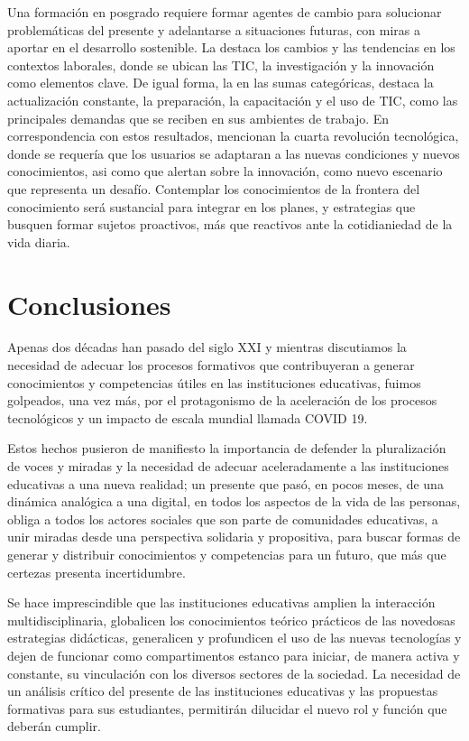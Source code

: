 \documentclass[spanish]{textolivre}
\begin{document}
Una formación en posgrado requiere formar agentes de cambio para solucionar problemáticas del presente y adelantarse a situaciones futuras, con miras a aportar en el desarrollo sostenible. La  destaca los cambios y las tendencias en los contextos laborales, donde se ubican las TIC, la investigación y la innovación como elementos clave. De igual forma, la  en las sumas categóricas, destaca la actualización constante, la preparación, la capacitación y el uso de TIC, como las principales demandas que se reciben en sus ambientes de trabajo. En correspondencia con estos resultados, \textcite{milic_implementation_2017} mencionan la cuarta revolución tecnológica, donde se requería que los usuarios se adaptaran a las nuevas condiciones y nuevos conocimientos, asi como \textcite{picatoste_new_2018} que alertan sobre la innovación, como nuevo escenario que representa un desafío. Contemplar los conocimientos de la frontera del conocimiento será sustancial para integrar en los planes, y estrategias que busquen formar sujetos proactivos, más que reactivos ante la cotidianiedad de la vida diaria.


\section{Conclusiones}\label{sec-format-simple}
Apenas dos décadas han pasado del siglo XXI y mientras discutiamos la necesidad de adecuar los procesos formativos que contribuyeran a generar conocimientos y competencias útiles en las instituciones educativas, fuimos golpeados, una vez más, por el protagonismo de la aceleración de los procesos tecnológicos y un impacto de escala mundial llamada COVID 19.  

Estos hechos pusieron de manifiesto la importancia de defender la pluralización de voces y miradas y la necesidad de adecuar aceleradamente a las instituciones educativas a una nueva realidad;  un presente que pasó, en pocos meses, de una dinámica analógica a una digital, en todos los aspectos de la vida de las personas, obliga a todos los actores sociales que son parte de comunidades educativas, a unir miradas desde una perspectiva solidaria y propositiva, para buscar formas de generar y distribuir conocimientos y competencias para un futuro, que más que certezas presenta incertidumbre.

Se hace imprescindible que las instituciones educativas amplien la interacción multidisciplinaria, globalicen los conocimientos teórico prácticos de las novedosas estrategias didácticas, generalicen y profundicen el uso de las nuevas tecnologías y dejen de funcionar como compartimentos estanco para iniciar, de manera activa y constante, su vinculación con los diversos sectores de la sociedad. La necesidad de un análisis crítico del presente de las instituciones educativas y las propuestas formativas para sus estudiantes, permitirán dilucidar el nuevo rol y función que deberán cumplir.
\end{document}
